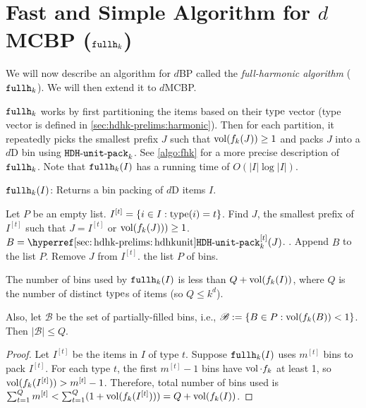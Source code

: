 \section{Fast and Simple Algorithm for \texorpdfstring{$d$}{d}MCBP
(\texorpdfstring{$\operatorname{\mathtt{fullh}}_{k}$}{fullh\_k})}
\label{sec:fhk}

We will now describe an algorithm for $d$BP called the \emph{full-harmonic algorithm}
($\operatorname{\mathtt{fullh}}_{k}$). We will then extend it to $d$MCBP.

$\operatorname{\mathtt{fullh}}_{k}$ works by first partitioning the items based on their $\operatorname{type}$ vector
(type vector is defined in \cref{sec:hdhk-prelims:harmonic}).
Then for each partition, it repeatedly picks the smallest prefix $J$
such that $\operatorname{vol}(f_k(J)) \ge 1$ and packs $J$ into a $d$D bin using $\operatorname{\mathtt{HDH-unit-pack}}_{k}$.
See \cref{algo:fhk} for a more precise description of $\operatorname{\mathtt{fullh}}_{k}$.
Note that $\operatorname{\mathtt{fullh}}_{k}(I)$ has a running time of $O(|I|\log |I|)$.

\begin{algorithm}[!ht]
\caption{$\operatorname{\mathtt{fullh}}_{k}(I)$: Returns a bin packing of $d$D items $I$.}
\label{algo:fhk}
\begin{algorithmic}[1]
\State Let $P$ be an empty list.
    \State $I^{[t]} = \{i \in I: \operatorname{type}(i) = t\}$.
        \State Find $J$, the smallest prefix of $I^{[t]}$ such that
            $J = I^{[t]}$ or $\operatorname{vol}(f_k(J))) \ge 1$.
        \State $B = \hdhkunitHyp^{[t]}(J)$.
            .
        \State Append $B$ to the list $P$.
        \State Remove $J$ from $I^{[t]}$.
    \EndWhile
\EndFor
\State \Return the list $P$ of bins.
\end{algorithmic}
\end{algorithm}

\begin{theorem}
\label{thm:fhk-fvol}
The number of bins used by $\operatorname{\mathtt{fullh}}_{k}(I)$ is less than $Q + \operatorname{vol}(f_k(I))$,
where $Q$ is the number of distinct $\operatorname{type}$s of items (so $Q \le k^d$).
\begin{optional}
Also, let $\mathscr{B}$ be the set of partially-filled bins, i.e.,
$\mathscr{B} := \{B \in P: \operatorname{vol}(f_k(B)) < 1\}$. Then $|\mathscr{B}| \le Q$.
\end{optional}
\end{theorem}
\begin{proof}
Let $I^{[t]}$ be the items in $I$ of type $t$.
Suppose $\operatorname{\mathtt{fullh}}_{k}(I)$ uses $m^{[t]}$ bins to pack $I^{[t]}$.
For each type $t$, the first $m^{[t]}-1$ bins have $\operatorname{vol}\cdot f_k$ at least 1,
so $\operatorname{vol}(f_k(I^{[t]})) > m^{[t]} - 1$.
Therefore, total number of bins used is
$\sum_{t=1}^Q m^{[t]} < \sum_{t=1}^Q (1 + \operatorname{vol}(f_k(I^{[t]})))
= Q + \operatorname{vol}(f_k(I))$.
\end{proof}

